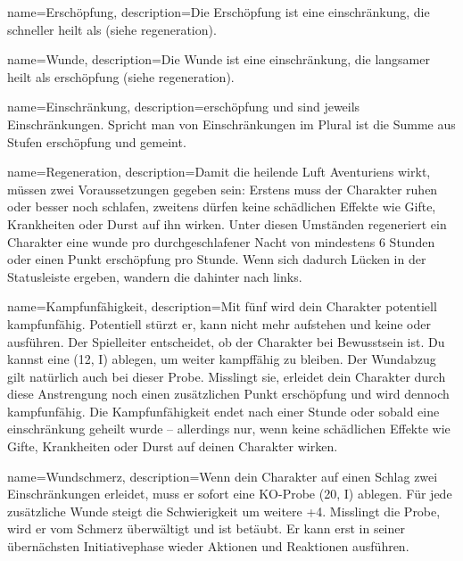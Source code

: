 
{
    name={Erschöpfung},
    description={Die Erschöpfung ist eine \gls{einschränkung}, die schneller heilt als  (siehe \gls{regeneration}).}}

{
    name={Wunde},
    description={Die Wunde ist eine \gls{einschränkung}, die langsamer heilt als \gls{erschöpfung} (siehe \gls{regeneration}).}}

{
    name={Einschränkung},
    description={\gls{erschöpfung} und  sind jeweils Einschränkungen. Spricht man von Einschränkungen im Plural ist die Summe aus Stufen \gls{erschöpfung} und  gemeint.}}

{
    name={Regeneration},
    description={Damit die heilende Luft Aventuriens wirkt, müssen zwei Vorauss­etzungen gegeben sein: Erstens muss der Charakter ruhen oder besser noch schlafen, zweitens dürfen keine schädlichen Effekte wie Gifte, Krankheiten oder Durst auf ihn wirken. Unter diesen Umständen regeneriert ein Charakter eine \gls{wunde} pro durchgeschlafener Nacht von mindestens 6 Stunden oder einen Punkt \gls{erschöpfung} pro Stunde. Wenn sich dadurch Lücken in der Statusleiste ergeben, wandern die  dahinter nach links.}}

{
    name={Kampfunfähigkeit},
    description={Mit fünf  wird dein Charakter potentiell kampfunfähig. Potentiell stürzt er, kann nicht mehr aufstehen und keine  oder  ausführen. Der Spielleiter entscheidet, ob der Charakter bei Bewusstsein ist. Du kannst eine  (12, \gls{I}) ablegen, um weiter kampffähig zu bleiben. Der Wundabzug gilt natürlich auch bei dieser Probe. Misslingt sie, erleidet dein Charakter durch diese Anstrengung noch einen zusätzlichen Punkt \gls{erschöpfung} und wird dennoch kampfunfähig. Die Kampfunfähigkeit endet nach einer Stunde oder sobald eine \gls{einschränkung} geheilt wurde – allerdings nur, wenn keine schädlichen Effekte wie Gifte, Krankheiten oder Durst auf deinen Charakter wirken.}}

{
    name={Wundschmerz},
    description={Wenn dein Charakter auf einen Schlag zwei Einschränkungen erleidet, muss er sofort eine KO-Probe (20, I) ablegen. Für jede zusätzliche Wunde steigt die Schwierigkeit um weitere +4. Misslingt die Probe, wird er vom Schmerz überwältigt und ist betäubt. Er kann erst in seiner übernächsten Initiativephase wieder Aktionen und Reaktionen ausführen.}}

